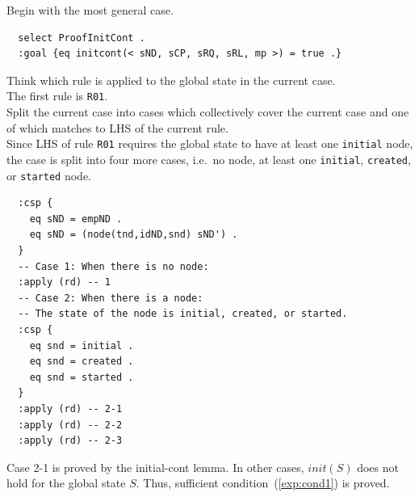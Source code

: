 \documentclass[12pt]{report}
\begin{document}
 Begin with the most general case.
\small
\begin{verbatim}
  select ProofInitCont .
  :goal {eq initcont(< sND, sCP, sRQ, sRL, mp >) = true .}
\end{verbatim}
\normalsize

 Think which rule is applied to the 
global state in the current case. \\
The first rule is {\tt R01}. \\

 Split the current case into cases which
collectively cover the current case and one of which matches to LHS of
the current rule. \\
Since LHS of rule {\tt R01} requires the global state to have at least
one {\tt initial} node, the case is split into four more cases, i.e.\ no
node, at least one {\tt initial}, {\tt created}, or {\tt started}
node.
\small
\begin{verbatim}
  :csp { 
    eq sND = empND .
    eq sND = (node(tnd,idND,snd) sND') .
  }
  -- Case 1: When there is no node:
  :apply (rd) -- 1
  -- Case 2: When there is a node:
  -- The state of the node is initial, created, or started.
  :csp { 
    eq snd = initial .
    eq snd = created .
    eq snd = started .
  }
  :apply (rd) -- 2-1
  :apply (rd) -- 2-2
  :apply (rd) -- 2-3
\end{verbatim}
\normalsize
Case 2-1 is proved by the initial-cont lemma. In other cases,
$init(S)$ does not hold for the global state $S$. Thus, sufficient
condition~(\ref{exp:cond1}) is proved.

\end{document}
